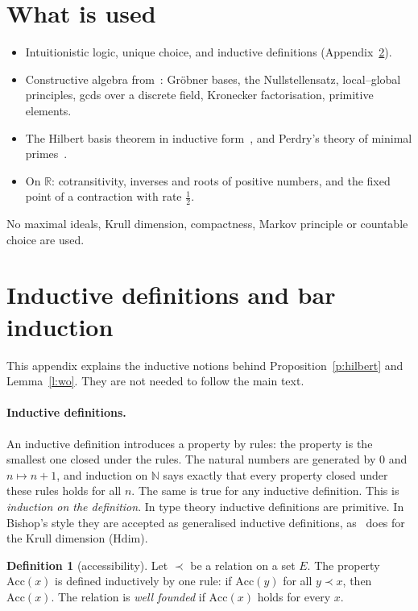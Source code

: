 \documentclass[11pt]{article}
\newcommand{\N}{\mathbb{N}}
\newcommand{\R}{\mathbb{R}}
\numberwithin{equation}{section}
\theoremstyle{plain}
\theoremstyle{definition}
\newtheorem{definition}[theorem]{Definition}
\theoremstyle{remark}
\begin{document}
\section{What is used}

\begin{itemize}
\item Intuitionistic logic, unique choice, and inductive definitions (Appendix~\ref{a:bar}).
\item Constructive algebra from~\cite{LQ}: Gröbner bases, the Nullstellensatz, local--global
  principles, gcds over a discrete field, Kronecker factorisation, primitive elements.
\item The Hilbert basis theorem in inductive form~\cite{CP}, and Perdry's theory of minimal
  primes~\cite{P}.
\item On $\R$: cotransitivity, inverses and roots of positive numbers, and the fixed point of a
  contraction with rate $\frac12$.
\end{itemize}
No maximal ideals, Krull dimension, compactness, Markov principle or countable choice are used.


\appendix
\section{Inductive definitions and bar induction}\label{a:bar}

This appendix explains the inductive notions behind Proposition~\ref{p:hilbert} and
Lemma~\ref{l:wo}. They are not needed to follow the main text.

\paragraph{Inductive definitions.} An inductive definition introduces a property by rules: the
property is the smallest one closed under the rules. The natural numbers are generated by $0$ and
$n\mapsto n+1$, and induction on $\N$ says exactly that every property closed under these rules
holds for all $n$. The same is true for any inductive definition. This is \emph{induction on the
definition}. In type theory inductive definitions are primitive. In Bishop's style they are
accepted as generalised inductive definitions, as~\cite{LQ} does for the Krull dimension
($\mathrm{Hdim}$).

\begin{definition}[accessibility]
Let $\prec$ be a relation on a set $E$. The property $\mathrm{Acc}(x)$ is defined inductively by one
rule: if $\mathrm{Acc}(y)$ for all $y\prec x$, then $\mathrm{Acc}(x)$. The relation is \emph{well
founded} if $\mathrm{Acc}(x)$ holds for every $x$.
\end{definition}
\end{document}
